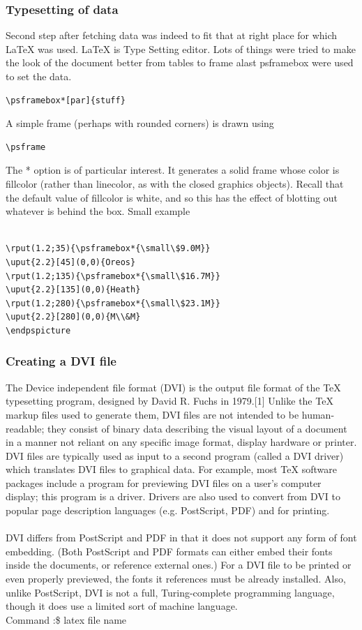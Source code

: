 \subsubsection{Typesetting of data}
Second step after fetching data was indeed to fit that at right place for which \LaTeX{} was used. \LaTeX{} is Type Setting editor. Lots of things were tried to make the look of the document better from tables to frame alast psframebox were used to set the data.
\begin{verbatim}
\psframebox*[par]{stuff}
\end{verbatim}
A simple frame (perhaps with rounded corners) is drawn using
\begin{verbatim}
\psframe
\end{verbatim}
The * option is of particular interest. It generates a solid frame whose color is fillcolor (rather than linecolor, as with the closed graphics objects). Recall that the default value of fillcolor is white, and so this has the effect of blotting out whatever is behind the
box. Small example\\
\\
\begin{verbatim}
\rput(1.2;35){\psframebox*{\small\$9.0M}}
\uput{2.2}[45](0,0){Oreos}
\rput(1.2;135){\psframebox*{\small\$16.7M}}
\uput{2.2}[135](0,0){Heath}
\rput(1.2;280){\psframebox*{\small\$23.1M}}
\uput{2.2}[280](0,0){M\\&M}
\endpspicture
\end{verbatim}
\subsubsection{Creating a DVI file}
The Device independent file format (DVI) is the output file format of the TeX typesetting program, designed by David R. Fuchs in 1979.[1] Unlike the TeX markup files used to generate them, DVI files are not intended to be human-readable; they consist of binary data describing the visual layout of a document in a manner not reliant on any
specific image format, display hardware or printer. DVI files are typically used as input to a second program (called a DVI driver) which translates DVI files to graphical data. For example, most TeX software packages include a program for previewing DVI files on a user’s computer display; this program is a driver. Drivers are also used to convert from DVI to popular page description languages (e.g. PostScript, PDF) and for printing.\\\\
DVI differs from PostScript and PDF in that it does not support any form of font embedding. (Both PostScript and PDF formats can either embed their fonts inside the
documents, or reference external ones.) For a DVI file to be printed or even properly previewed, the fonts it references must be already installed. Also, unlike PostScript, DVI is not a full, Turing-complete programming language, though it does use a limited sort of machine language.\\
Command :\$ latex file name
